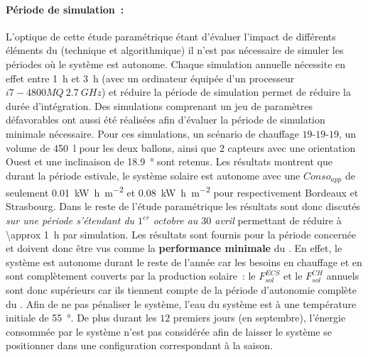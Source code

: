 \paragraph{Période de simulation~:} %
\label{par:periode_de_simulation}
L’optique de cette étude paramétrique étant d’évaluer l’impact de différents éléments du
 (technique et algorithmique) il n’est pas nécessaire de simuler les périodes où
le système est autonome. Chaque simulation annuelle nécessite en effet entre
\SI{1}{\hour} et \SI{3}{\hour} (avec un ordinateur équipée d’un processeur $i7-4800MQ\  \SI{2.7}{GHz}$)
et réduire la période de simulation permet de réduire la durée
d’intégration. Des simulations comprenant un jeu de paramètres défavorables ont aussi été
réalisées afin d’évaluer la période de simulation minimale nécessaire. Pour ces
simulations, un scénario de chauffage $19$-$19$-$19$, un volume de \SI{450}{\litre} pour les
deux ballons, ainsi que \num{2} capteurs avec une orientation Ouest et une inclinaison de
\SI{18.9}{\degree} sont retenus. Les résultats montrent que durant la
période estivale, le système solaire est autonome avec une $Conso_{app}$ de seulement
\SI[per-mode=symbol]{0.01}{\kilo\watt\hour\per\metre\squared} et
\SI[per-mode=symbol]{0.08}{\kilo\watt\hour\per\metre\squared}
pour respectivement Bordeaux et Strasbourg. Dans le reste de l’étude paramétrique
les résultats sont donc discutés \emph{sur une période s’étendant du $1^{er}$
octobre au $30$ avril} permettant de réduire à \SI{\approx 1}{\hour} par simulation. Les
résultats sont fournis pour la période concernée et doivent donc être vus comme la
\textbf{performance minimale} du . En effet, le système est autonome durant le reste
de l’année car les besoins en chauffage et en  sont complètement couverts par la
production solaire~: le $F_{sol}^{ECS}$ et le $F_{sol}^{CH}$ annuels sont donc
supérieurs car ils tiennent compte de la période d’autonomie complète du .
Afin de ne pas pénaliser le système, l’eau du système est à une température
initiale de \SI{55}{\degree}. De plus durant les $12$ premiers jours (en septembre),
l’énergie consommée par le système n’est pas considérée afin de laisser le système
se positionner dans une configuration correspondant à la saison.




